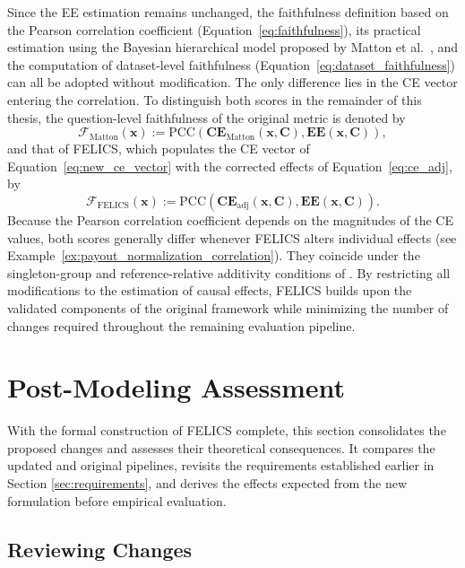 Since the EE estimation remains unchanged, the faithfulness definition based on the Pearson correlation coefficient (Equation~\ref{eq:faithfulness}), its practical estimation using the Bayesian hierarchical model proposed by Matton et al.~\cite{mattonWalkTalkMeasuring2024}, and the computation of dataset-level faithfulness (Equation~\ref{eq:dataset_faithfulness}) can all be adopted without modification. The only difference lies in the CE vector entering the correlation. To distinguish both scores in the remainder of this thesis, the question-level faithfulness of the original metric is denoted by
\begin{equation}
	\label{eq:faithfulness_matton}
	\mathcal{F}_{\mathrm{Matton}}(\mathbf{x}) := \mathrm{PCC}\left(\mathbf{CE}_{\mathrm{Matton}}(\mathbf{x},\mathbf{C}),\mathbf{EE}(\mathbf{x},\mathbf{C})\right),
\end{equation}
and that of FELICS, which populates the CE vector of Equation~\ref{eq:new_ce_vector} with the corrected effects of Equation~\ref{eq:ce_adj}, by
\begin{equation}
	\label{eq:faithfulness_felics}
	\mathcal{F}_{\mathrm{FELICS}}(\mathbf{x}) := \mathrm{PCC}\left(\mathbf{CE}_{\mathrm{adj}}(\mathbf{x},\mathbf{C}),\mathbf{EE}(\mathbf{x},\mathbf{C})\right).
\end{equation}
Because the Pearson correlation coefficient depends on the magnitudes of the CE values, both scores generally differ whenever FELICS alters individual effects (see Example~\ref{ex:payout_normalization_correlation}). They coincide under the singleton-group and reference-relative additivity conditions of . By restricting all modifications to the estimation of causal effects, FELICS builds upon the validated components of the original framework while minimizing the number of changes required throughout the remaining evaluation pipeline.

\section{Post-Modeling Assessment}
With the formal construction of FELICS complete, this section consolidates the proposed changes and assesses their theoretical consequences. It compares the updated and original pipelines, revisits the requirements established earlier in Section \ref{sec:requirements}, and derives the effects expected from the new formulation before empirical evaluation.

\subsection{Reviewing Changes}

